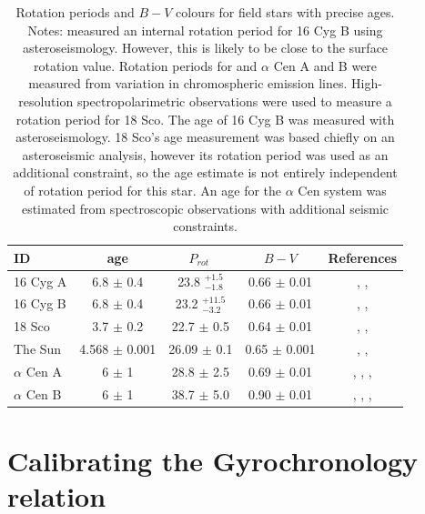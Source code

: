 \documentclass[useAMS, usenatbib]{mn2e}
\newcommand{\prot}{$P_{rot}~$}
\begin{document}
\begin{table}
\caption{Rotation periods and $B-V$ colours for field stars with precise
	ages.
Notes: \citet{Davies2014} measured an internal rotation period for 16 Cyg B
using asteroseismology.
However, this is likely to be close to the surface rotation value.
Rotation periods for and $\alpha$ Cen A and B were measured
from variation in chromospheric emission lines.
High-resolution spectropolarimetric observations were used to measure
a rotation period for 18 Sco.
The age of 16 Cyg B was measured with asteroseismology.
18 Sco's age measurement was based chiefly on an asteroseismic analysis,
however its rotation period was used as an additional constraint, so the age
estimate is not entirely independent of rotation period for this star.
An age for the $\alpha$ Cen system was estimated from spectroscopic
observations with additional seismic constraints.\label{tab:field}}

\begin{tabular}{lcccc}
\hline\hline
{ID} & {age} & {\prot} & {$B-V$} & References\\
\hline
16 Cyg A & 6.8 $\pm$ 0.4 & 23.8 $^{+1.5}_{-1.8}$ & 0.66 $\pm$ 0.01 &
\citet{Metcalfe2012}, \citet{Davies2014}, \citet{Moffett1979} \\
16 Cyg B & 6.8 $\pm$ 0.4 & 23.2 $^{+11.5}_{-3.2}$ & 0.66 $\pm$ 0.01 &
\citet{Metcalfe2012}, \citet{Davies2014}, \citet{Moffett1979} \\
18 Sco & 3.7 $\pm$ 0.2 & 22.7 $\pm$ 0.5 & 0.64 $\pm$ 0.01 &
\citet{Li2012}, \citet{Petit2008}, \citet{Mermilliod1986} \\
The Sun & 4.568 $\pm$ 0.001 & 26.09 $\pm$ 0.1 & 0.65 $\pm$ 0.001 &
\citet{Bouvier2010}, \citet{Donahue1996}, \citet{Cox2000} \\
$\alpha$ Cen A & 6 $\pm$ 1 & 28.8 $\pm$ 2.5 &
0.69 $\pm$ 0.01 &
\citet{Bazot2012}, \citet{Yildiz2007}, \citet{Hallam1991}, \citet{Mermilliod1986}\\
$\alpha$ Cen B & 6 $\pm$ 1 & 38.7 $\pm$ 5.0 &
0.90 $\pm$ 0.01 &
\citet{Bazot2012}, \citet{Yildiz2007}, \citet{Dumusque2012}, \citet{Mermilliod1986} \\
\hline
\end{tabular}
\end{table}

\section{Calibrating the Gyrochronology relation}
\label{sec:gyro_cal}
\end{document}
